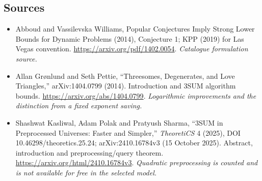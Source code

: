 \documentclass[11pt,a4paper]{article}
\numberwithin{equation}{section}
\begin{document}
\subsection{Sources}
\begin{itemize}\raggedright
\item[\textnormal{[S1]}]\hypertarget{source:statement:1}{} Abboud and Vassilevska Williams, Popular Conjectures Imply Strong Lower Bounds for Dynamic Problems (2014), Conjecture 1; KPP (2019) for Las Vegas convention.
\url{https://arxiv.org/pdf/1402.0054}.
{\small\textit{Catalogue formulation source.}}
\item[\textnormal{[E1]}]\hypertarget{extra:statement:1}{} Allan Gr\o nlund and Seth Pettie, ``Threesomes, Degenerates, and Love Triangles,'' arXiv:1404.0799 (2014). Introduction and 3SUM algorithm bounds.
\url{https://arxiv.org/abs/1404.0799}.
{\small\textit{Logarithmic improvements and the distinction from a fixed exponent saving.}}
\item[\textnormal{[E2]}]\hypertarget{extra:statement:2}{} Shashwat Kasliwal, Adam Polak and Pratyush Sharma, ``3SUM in Preprocessed Universes: Faster and Simpler,'' \emph{TheoretiCS} 4 (2025), DOI 10.46298/theoretics.25.24; arXiv:2410.16784v3 (15 October 2025). Abstract, introduction and preprocessing/query theorem.
\url{https://arxiv.org/html/2410.16784v3}.
{\small\textit{Quadratic preprocessing is counted and is not available for free in the selected model.}}
\end{itemize}
\end{document}
